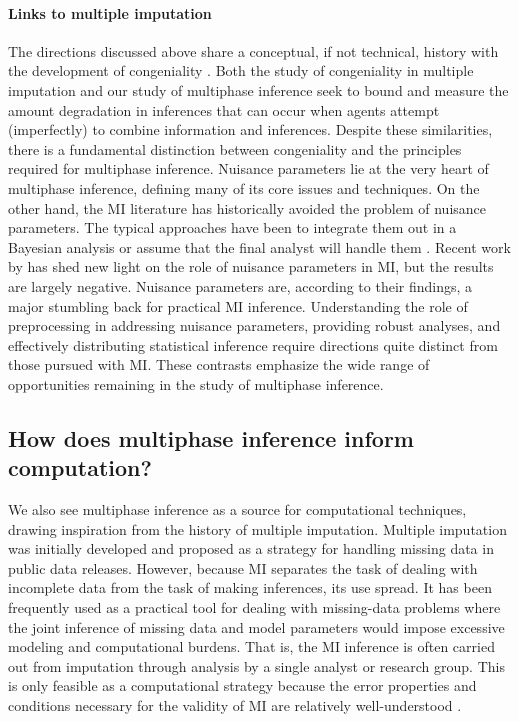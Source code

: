 \paragraph{Links to multiple imputation}
The directions discussed above share a conceptual, if not technical, history with the development of congeniality \citep{Meng1994}.
Both the study of congeniality in multiple imputation and our study of multiphase inference seek to bound and measure the amount degradation in inferences that can occur when agents attempt (imperfectly) to combine information and inferences.
Despite these similarities, there is a fundamental distinction between congeniality and the principles required for multiphase inference.
Nuisance parameters lie at the very heart of multiphase inference, defining many of its core issues and techniques.
On the other hand, the MI literature has historically avoided the problem of nuisance parameters.
The typical approaches have been to integrate them out in a Bayesian analysis \citep[e.g.][]{Rubin1996} or assume that the final analyst will handle them \citep[e.g.][]{Nielsen2003}.
Recent work by \cite{Xie2012} has shed new light on the role of nuisance parameters in MI, but the results are largely negative.
Nuisance parameters are, according to their findings, a major stumbling back for practical MI inference.
Understanding the role of preprocessing in addressing nuisance parameters, providing robust analyses, and effectively distributing statistical inference require directions quite distinct from those pursued with MI.
These contrasts emphasize the wide range of opportunities remaining in the study of multiphase inference.

\subsection{How does multiphase inference inform computation?}
\label{multiphase:sec:computation}

We also see multiphase inference as a source for computational techniques, drawing inspiration from the history of multiple imputation.
Multiple imputation was initially developed and proposed as a strategy for handling missing data in public data releases.
However, because MI separates the task of dealing with incomplete data from the task of making inferences, its use spread.
It has been frequently used as a practical tool for dealing with missing-data problems where the joint inference of missing data and model parameters would impose excessive modeling and computational burdens.
That is, the MI inference is often carried out from imputation through analysis by a single analyst or research group.
This is only feasible as a computational strategy because the error properties and conditions necessary for the validity of MI are relatively well-understood \citep[e.g.,][]{Xie2012}.

